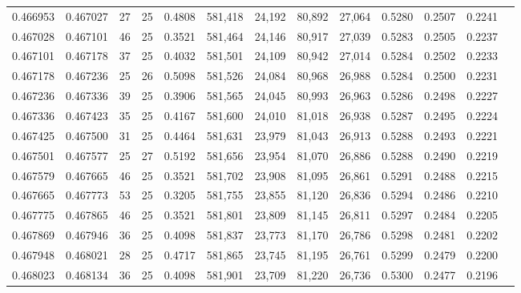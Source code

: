 \begin{tabular}{rrrrrrrrrrrrr}
0.466953 & 0.467027 &    27 &  25 &                                     0.4808 & 581,418 &  24,192 &  80,892 &  27,064 & 0.5280 & 0.2507 & 0.2241 \\
0.467028 & 0.467101 &    46 &  25 &                                     0.3521 & 581,464 &  24,146 &  80,917 &  27,039 & 0.5283 & 0.2505 & 0.2237 \\
0.467101 & 0.467178 &    37 &  25 &                                     0.4032 & 581,501 &  24,109 &  80,942 &  27,014 & 0.5284 & 0.2502 & 0.2233 \\
0.467178 & 0.467236 &    25 &  26 &                                     0.5098 & 581,526 &  24,084 &  80,968 &  26,988 & 0.5284 & 0.2500 & 0.2231 \\
0.467236 & 0.467336 &    39 &  25 &                                     0.3906 & 581,565 &  24,045 &  80,993 &  26,963 & 0.5286 & 0.2498 & 0.2227 \\
0.467336 & 0.467423 &    35 &  25 &                                     0.4167 & 581,600 &  24,010 &  81,018 &  26,938 & 0.5287 & 0.2495 & 0.2224 \\
0.467425 & 0.467500 &    31 &  25 &                                     0.4464 & 581,631 &  23,979 &  81,043 &  26,913 & 0.5288 & 0.2493 & 0.2221 \\
0.467501 & 0.467577 &    25 &  27 &                                     0.5192 & 581,656 &  23,954 &  81,070 &  26,886 & 0.5288 & 0.2490 & 0.2219 \\
0.467579 & 0.467665 &    46 &  25 &                                     0.3521 & 581,702 &  23,908 &  81,095 &  26,861 & 0.5291 & 0.2488 & 0.2215 \\
0.467665 & 0.467773 &    53 &  25 &                                     0.3205 & 581,755 &  23,855 &  81,120 &  26,836 & 0.5294 & 0.2486 & 0.2210 \\
0.467775 & 0.467865 &    46 &  25 &                                     0.3521 & 581,801 &  23,809 &  81,145 &  26,811 & 0.5297 & 0.2484 & 0.2205 \\
0.467869 & 0.467946 &    36 &  25 &                                     0.4098 & 581,837 &  23,773 &  81,170 &  26,786 & 0.5298 & 0.2481 & 0.2202 \\
0.467948 & 0.468021 &    28 &  25 &                                     0.4717 & 581,865 &  23,745 &  81,195 &  26,761 & 0.5299 & 0.2479 & 0.2200 \\
0.468023 & 0.468134 &    36 &  25 &                                     0.4098 & 581,901 &  23,709 &  81,220 &  26,736 & 0.5300 & 0.2477 & 0.2196 \\

\end{tabular}
